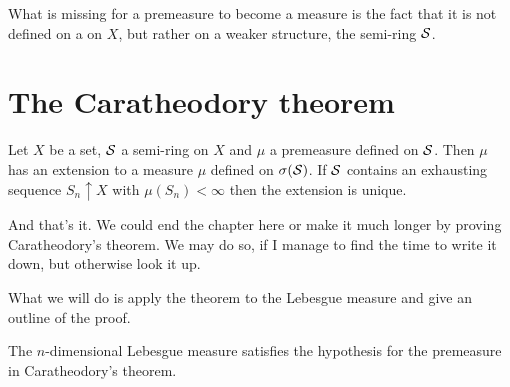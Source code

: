 What is missing for a premeasure to become a measure is the fact that it is not defined on a \siga on $X$, but rather on a weaker structure, the semi-ring $\mathcal{S}$.

\section{The Caratheodory theorem}

\begin{thm}[Caratheodory]
	Let $X$ be a set, $\mathcal{S}$ a semi-ring on $X$ and $\mu$ a premeasure defined on $\mathcal{S}$. Then $\mu$ has an extension to a measure $\mu$ defined on $\sigma(\mathcal{S})$. If $\mathcal{S}$ contains an exhausting sequence $S_n \uparrow X$ with $\mu(S_n) < \infty$ then the extension is unique.
\end{thm}

And that's it. We could end the chapter here or make it much longer by proving Caratheodory's theorem. We may do so, if I manage to find the time to write it down, but otherwise look it up.

What we will do is apply the theorem to the Lebesgue measure and give an outline of the proof.

\begin{remark}
	The $n$-dimensional Lebesgue measure satisfies the hypothesis for the premeasure in Caratheodory's theorem.
\end{remark}